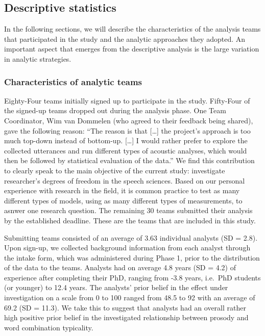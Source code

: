 \documentclass[Review,times,sageh]{sagej}
\begin{document}
\hypertarget{descriptive-statistics-1}{%
\subsection{Descriptive statistics}\label{descriptive-statistics-1}}

In the following sections, we will describe the characteristics of the analysis teams that participated in the study and the analytic approaches they adopted.
An important aspect that emerges from the descriptive analysis is the large variation in analytic strategies.

\hypertarget{characteristics-of-analytic-teams}{%
\subsubsection{Characteristics of analytic teams}\label{characteristics-of-analytic-teams}}

Eighty-Four teams initially signed up to participate in the study.
Fifty-Four of the signed-up teams dropped out during the analysis phase.
One Team Coordinator, Wim van Dommelen (who agreed to their feedback being shared), gave the following reason: ``The reason is that {[}\ldots{]} the project's approach is too much top-down instead of bottom-up. {[}\ldots{]} I would rather prefer to explore the collected utterances and run different types of acoustic analyses, which would then be followed by statistical evaluation of the data.''
We find this contribution to clearly speak to the main objective of the current study: investigate researcher's degrees of freedom in the speech sciences.
Based on our personal experience with research in the field, it is common practice to test as many different types of models, using as many different types of measurements, to asnwer one research question.
The remaining 30 teams submitted their analysis by the established deadline.
These are the teams that are included in this study.

Submitting teams consisted of an average of 3.63 individual analysts (SD = 2.8).
Upon sign-up, we collected background information from each analyst through the intake form, which was administered during Phase 1, prior to the distribution of the data to the teams.
Analysts had on average 4.8 years (SD = 4.2) of experience after completing their PhD, ranging from -3.8 years, i.e.~PhD students (or younger) to 12.4 years.
The analysts' prior belief in the effect under investigation on a scale from 0 to 100 ranged from 48.5 to 92 with an average of 69.2 (SD = 11.3).
We take this to suggest that analysts had an overall rather high positive prior belief in the investigated relationship between prosody and word combination typicality.
\end{document}
